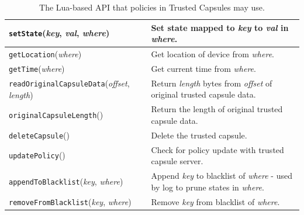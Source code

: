 \begin{table}[t]
\begin{center}
{\begin{tabular}{l|l}
                {\tt setState}({\em key}, {\em val}, {\em where})
                                    & Set state mapped to {\em key} to {\em val} in {\em where}.                                         \\\hline

                {\tt getLocation}({\em where})
                                    & Get location of device from {\em where}.                                                           \\\hline

                {\tt getTime}({\em where})
                                    & Get current time from {\em where}.                                                                 \\\hline

                {\tt readOriginalCapsuleData}({\em offset}, {\em length})
                                    & Return {\em length} bytes from {\em offset} of original trusted capsule data.                      \\\hline

                {\tt originalCapsuleLength}()
                                    & Return the length of original trusted capsule data.                                                \\\hline

                {\tt deleteCapsule}()
                                    & Delete the trusted capsule.                                                                        \\\hline

                {\tt updatePolicy}()
                                    & Check for policy update with trusted capsule server.                                               \\\hline

                {\tt appendToBlacklist}({\em key}, {\em where})
                                    & Append {\em key} to blacklist of {\em where} - used by log to prune states in {\em where}.         \\\hline

                {\tt removeFromBlacklist}({\em key}, {\em where})
                                    & Remove {\em key} from blacklist of {\em where}.                                                    \\\hline
            \end{tabular}
        }
        \caption{The Lua-based API that policies in Trusted Capsules may use.}
        \label{Tbl:lua_ext}
    \end{center}
\end{table}


